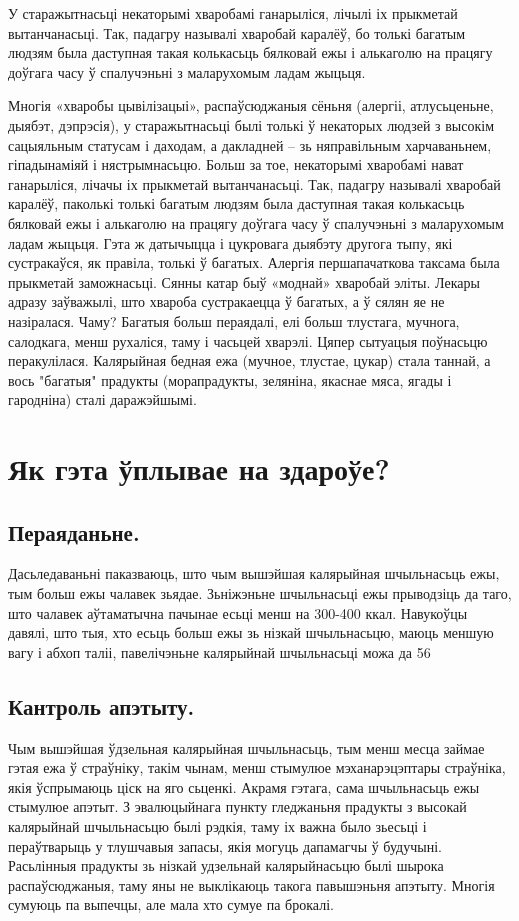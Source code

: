 У старажытнасьці некаторымі хваробамі ганарыліся, лічылі іх прыкметай вытанчанасьці. Так, падагру называлі хваробай каралёў, бо толькі багатым людзям была даступная такая колькасьць бялковай ежы і алькаголю на працягу доўгага часу ў спалучэньні з маларухомым ладам жыцьця.

Многія «хваробы цывілізацыі», распаўсюджаныя сёньня (алергіі, атлусьценьне, дыябэт, дэпрэсія), у старажытнасьці былі толькі ў некаторых людзей з высокім сацыяльным статусам і даходам, а дакладней – зь няправільным харчаваньнем, гіпадынаміяй і нястрымнасьцю. Больш за тое, некаторымі хваробамі нават ганарыліся, лічачы іх прыкметай вытанчанасьці. Так, падагру называлі хваробай каралёў, паколькі толькі багатым людзям была даступная такая колькасьць бялковай ежы і алькаголю на працягу доўгага часу ў спалучэньні з маларухомым ладам жыцьця. Гэта ж датычыцца і цукровага дыябэту другога тыпу, які сустракаўся, як правіла, толькі ў багатых. Алергія першапачаткова таксама была прыкметай заможнасьці. Сянны катар быў «моднай» хваробай эліты. Лекары адразу заўважылі, што хвароба сустракаецца ў багатых, а ў сялян яе не назіралася. Чаму? Багатыя больш пераядалі, елі больш тлустага, мучнога, салодкага, менш рухаліся, таму і часьцей хварэлі. Цяпер сытуацыя поўнасьцю перакулілася. Калярыйная бедная ежа (мучное, тлустае, цукар) стала таннай, а вось "багатыя" прадукты (морапрадукты, зеляніна, якаснае мяса, ягады і гародніна) сталі даражэйшымі.

\section{Як гэта ўплывае на здароўе?}

\subsection{Пераяданьне.}
Дасьледаваньні паказваюць, што чым вышэйшая калярыйная шчыльнасьць ежы, тым больш ежы чалавек зьядае. Зьніжэньне шчыльнасьці ежы прыводзіць да таго, што чалавек аўтаматычна пачынае есьці менш на 300-400 ккал. Навукоўцы давялі, што тыя, хто есьць больш ежы зь нізкай шчыльнасьцю, маюць меншую вагу і абхоп таліі, павелічэньне калярыйнай шчыльнасьці можа да 56%

\subsection{Кантроль апэтыту.}
Чым вышэйшая ўдзельная калярыйная шчыльнасьць, тым менш месца займае гэтая ежа ў страўніку, такім чынам, менш стымулюе мэханарэцэптары страўніка, якія ўспрымаюць ціск на яго сьценкі. Акрамя гэтага, сама шчыльнасьць ежы стымулюе апэтыт. З эвалюцыйнага пункту гледжаньня прадукты з высокай калярыйнай шчыльнасьцю былі рэдкія, таму іх важна было зьесьці і пераўтварыць у тлушчавыя запасы, якія могуць дапамагчы ў будучыні. Расьлінныя прадукты зь нізкай удзельнай калярыйнасьцю былі шырока распаўсюджаныя, таму яны не выклікаюць такога павышэньня апэтыту. Многія сумуюць па выпечцы, але мала хто сумуе па брокалі.


